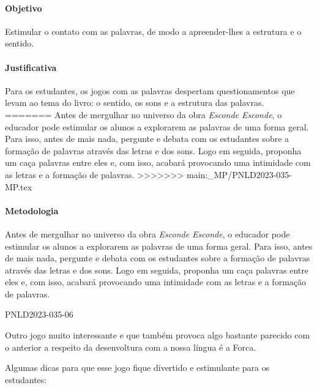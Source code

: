 \documentclass[11pt]{extarticle}
\begin{document}
\paragraph{Objetivo} Estimular o contato com as palavras, de modo a apreender-lhes a estrutura e o sentido. 

\paragraph{Justificativa} Para os estudantes, os jogos com as palavras despertam questionamentos que levam ao tema do livro: o sentido, os sons e a estrutura das palavras.   
=======
Antes de mergulhar no universo da obra \textit{Esconde Esconde}, o educador pode estimular os alunos a explorarem as palavras de uma forma geral. Para isso, antes de mais nada, pergunte e debata com os estudantes sobre a formação de palavras através das letras e dos sons. Logo em seguida, proponha um caça palavras entre eles e, com isso, acabará provocando uma intimidade com as letras e a formação de palavras. 
>>>>>>> main:_MP/PNLD2023-035-MP.tex

\paragraph{Metodologia} Antes de mergulhar no universo da obra \textit{Esconde Esconde}, o educador pode estimular os alunos a explorarem as palavras de uma forma geral. Para isso, antes de mais nada, pergunte e debata com os estudantes sobre a formação de palavras através das letras e dos sons. Logo em seguida, proponha um caça palavras entre eles e, com isso, acabará provocando uma intimidade com as letras e a formação de palavras. 

PNLD2023-035-06

Outro jogo muito interessante e que também provoca algo bastante parecido com o anterior a respeito da desenvoltura com a nossa língua é a Forca. 

Algumas dicas para que esse jogo fique divertido e estimulante para os estudantes: 
\end{document}
